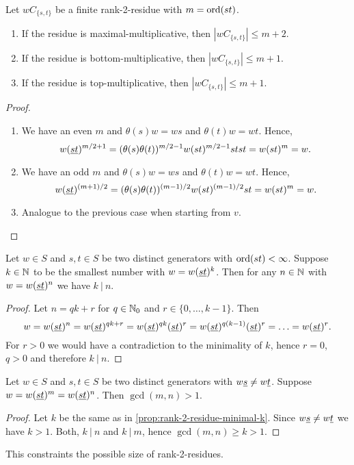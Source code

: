 \begin{lemm}
	Let $wC_{\{s,t\}}$ be a finite rank-2-residue with $m = \operatorname{ord}(st)$.
	\begin{enumerate}
		\item If the residue is maximal-multiplicative, then $|wC_{\{s,t\}}| \leq m+2$.
		\item If the residue is bottom-multiplicative, then $|wC_{\{s,t\}}| \leq m+1$.
		\item If the residue is top-multiplicative, then $|wC_{\{s,t\}}| \leq m+1$. 
	\end{enumerate}

	\begin{proof}
		\begin{enumerate}
			\item We have an even $m$ and $\theta(s)w = ws$ and $\theta(t)w = wt$. Hence,
			$$ w (\underline{s} \underline{t})^{m/2+1} = (\theta(s)\theta(t))^{m/2-1} w (st)^{m/2-1} stst = w(st)^m = w. $$
			\item We have an odd $m$ and $\theta(s)w = ws$ and $\theta(t)w = wt$. Hence,
			$$ w (\underline{s} \underline{t})^{(m+1)/2} = (\theta(s)\theta(t))^{(m-1)/2} w (st)^{(m-1)/2} st = w(st)^m = w. $$
			\item Analogue to the previous case when starting from $v$. \qedhere
		\end{enumerate}
	\end{proof}
\end{lemm}

\begin{prop}
	Let $w \in S$ and $s,t \in S$ be two distinct generators with $\operatorname{ord}(st) < \infty$. Suppose $k \in \mathbb{N}$ to be the smallest number with $w = w(\underline{s} \underline{t})^k$. Then for any $n \in \mathbb{N}$ with $w = w(\underline{s} \underline{t})^n$ we have $k \ | \ n$.

	\begin{proof}
		Let $n = qk + r$ for $q \in \mathbb{N}_0$ and $r \in \{0,\ldots,k-1\}$. Then
		$$ w = w(\underline{s} \underline{t})^n = w(\underline{s} \underline{t})^{qk+r} = w(\underline{s} \underline{t})^{qk} (\underline{s} \underline{t})^r = w (\underline{s} \underline{t})^{q(k-1)} (\underline{s} \underline{t})^r = \ldots = w(\underline{s} \underline{t})^r. $$
		For $r > 0$ we would have a contradiction to the minimality of $k$, hence $r = 0$, $q > 0$ and therefore $k \ | \ n$.
	\end{proof}
\end{prop}

\begin{coro}
	Let $w \in S$ and $s,t \in S$ be two distinct generators with $w \underline{s} \neq w \underline{t}$. Suppose $w = w(\underline{s} \underline{t})^m = w(\underline{s} \underline{t})^n$. Then $\gcd(m,n) > 1$.

	\begin{proof}
		Let $k$ be the same as in \ref{prop:rank-2-residue-minimal-k}. Since $w \underline{s} \neq w \underline{t}$ we have $k > 1$. Both, $k \ | \ n$ and $k \ | \ m$, hence $\gcd(m,n) \geq k > 1$.
	\end{proof}
\end{coro}

This constraints the possible size of rank-2-residues.